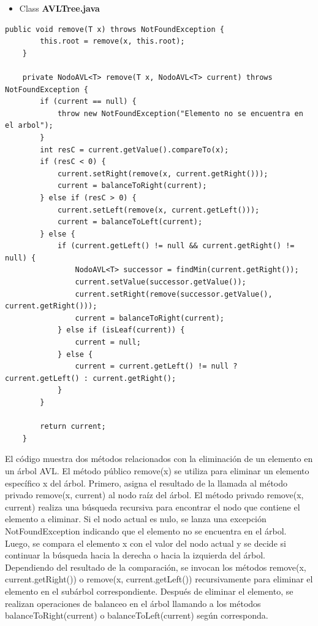 \documentclass{article}
\begin{document}
\begin{itemize}
        \item Class \textbf{AVLTree.java}
    \end{itemize}
    \begin{lstlisting}[caption={\textbf{Parte 2:}}]
  public void remove(T x) throws NotFoundException {
        this.root = remove(x, this.root);
    }

    private NodoAVL<T> remove(T x, NodoAVL<T> current) throws NotFoundException {
        if (current == null) {
            throw new NotFoundException("Elemento no se encuentra en el arbol");
        }
        int resC = current.getValue().compareTo(x);
        if (resC < 0) {
            current.setRight(remove(x, current.getRight()));
            current = balanceToRight(current);
        } else if (resC > 0) {
            current.setLeft(remove(x, current.getLeft()));
            current = balanceToLeft(current);
        } else {
            if (current.getLeft() != null && current.getRight() != null) {
                NodoAVL<T> successor = findMin(current.getRight());
                current.setValue(successor.getValue());
                current.setRight(remove(successor.getValue(), current.getRight()));
                current = balanceToRight(current);
            } else if (isLeaf(current)) {
                current = null;
            } else {
                current = current.getLeft() != null ? current.getLeft() : current.getRight();
            }
        }

        return current;
    }
         \end{lstlisting}
El código muestra dos métodos relacionados con la eliminación de un elemento en un árbol AVL. El método público remove(x) se utiliza para eliminar un elemento específico x del árbol. Primero, asigna el resultado de la llamada al método privado remove(x, current) al nodo raíz del árbol. El método privado remove(x, current) realiza una búsqueda recursiva para encontrar el nodo que contiene el elemento a eliminar. Si el nodo actual es nulo, se lanza una excepción NotFoundException indicando que el elemento no se encuentra en el árbol. Luego, se compara el elemento x con el valor del nodo actual y se decide si continuar la búsqueda hacia la derecha o hacia la izquierda del árbol. Dependiendo del resultado de la comparación, se invocan los métodos remove(x, current.getRight()) o remove(x, current.getLeft()) recursivamente para eliminar el elemento en el subárbol correspondiente. Después de eliminar el elemento, se realizan operaciones de balanceo en el árbol llamando a los métodos balanceToRight(current) o balanceToLeft(current) según corresponda.
\end{document}
